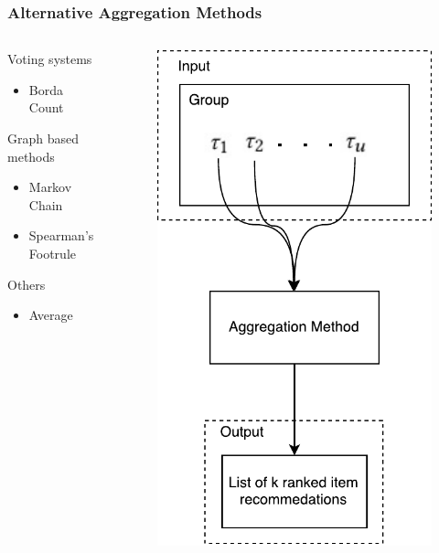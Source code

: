\begin{frame}
\frametitle{Alternative Aggregation Methods}
\begin{columns}
	\begin{column}{0.5\textwidth}
		Voting systems
		\begin{itemize}
			\item Borda Count
		\end{itemize}
		Graph based methods
		\begin{itemize}
			\item Markov Chain 
			\item Spearman's Footrule
		\end{itemize}
		Others
		\begin{itemize}
			\item Average
		\end{itemize}
	\end{column}
	\begin{column}{0.5\textwidth}
		\begin{figure}
			\centering
			\includegraphics[scale=.4]{graphics/setuptransposed}
		\end{figure}
	\end{column}
\end{columns}
\end{frame}

%
